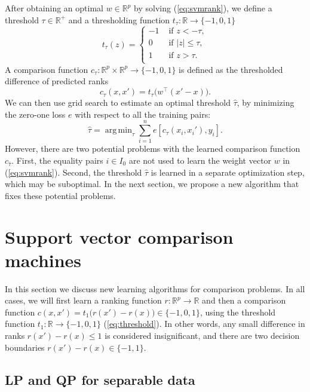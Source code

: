 \documentclass{article}
\newcommand{\RR}{\mathbb R}
\DeclareMathOperator*{\argmin}{arg\,min}
\begin{document}
After obtaining an optimal $w\in\RR^p$ by solving (\ref{eq:svmrank}),
we define a threshold $\tau\in\RR^+$ and a thresholding function
$t_\tau:\RR\rightarrow\{-1,0,1\}$
\begin{equation}
  \label{eq:threshold}
  t_\tau(z) = 
  \begin{cases}
    -1 & \text{ if } z < -\tau, \\
    0 & \text{ if } |z| \leq \tau, \\
    1 & \text{ if } z > \tau. \\
  \end{cases}
\end{equation}
A comparison function $c_\tau:\RR^p\times \RR^p\rightarrow \{-1, 0,
1\}$ is defined as the thresholded difference of predicted ranks
\begin{equation}
  \label{eq:svmrank_c_t}
  c_\tau(x, x') = 
  t_\tau\big(
  w^\intercal(x' - x)
  \big).
\end{equation}
We can then use grid search to estimate an optimal threshold $\hat
\tau$, by minimizing the zero-one loss $e$ with respect to all the
training pairs:
\begin{equation}
  \hat \tau = \argmin_{\tau}
  \sum_{i=1}^n
  e\left[ c_\tau(x_i, x_i'), y_i \right].
\end{equation}
However, there are two potential problems with the learned comparison
function $c_{\hat\tau}$. First, the equality pairs $i\in I_0$ are not
used to learn the weight vector $w$ in (\ref{eq:svmrank}). Second, the
threshold $\hat \tau$ is learned in a separate optimization step, which
may be suboptimal. In the next section, we propose a new algorithm
that fixes these potential problems.
\section{Support vector comparison machines}
\label{sec:svm-compare}

In this section we discuss new learning algorithms for comparison
problems. In all cases, we will first learn a ranking function
$r:\RR^p\rightarrow\RR$ and then a comparison function $c(x,
x')=t_1\big( r(x') - r(x) \big)\in\{-1,0,1\}$, using the threshold
function $t_1:\RR\rightarrow\{-1,0,1\}$ (\ref{eq:threshold}). 
In other
words, any small difference in ranks $r(x')-r(x)\leq 1$ is considered
insignificant, and there are two decision boundaries
$r(x')-r(x)\in\{-1,1\}$.

\subsection{LP and QP for separable data}
\label{sec:lp-qp}
\end{document}
